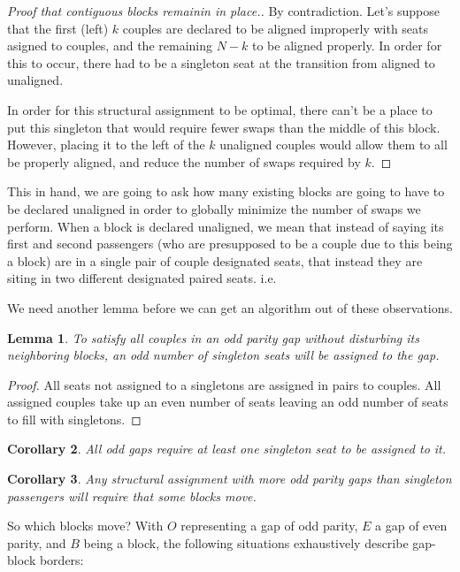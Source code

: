 \documentclass[a4paper]{article}
\newtheorem{lem}{Lemma}[section]
\newtheorem{cor}[lem]{Corollary}
\begin{document}
\begin{proof}[Proof that contiguous blocks remainin in place.]
By contradiction.  Let's suppose that the first (left) $k$ couples are declared to be aligned improperly with seats asigned to couples, and the remaining $N-k$ to be aligned properly.  In order for this to occur, there had to be a singleton seat at the transition from aligned to unaligned.  

In order for this structural assignment to be optimal, there can't be a place to put this singleton that would require fewer swaps than the middle of this block.  However, placing it to the left of the $k$ unaligned couples would allow them to all be properly aligned, and reduce the number of swaps required by $k$.
\end{proof}

This in hand, we are going to ask how many existing blocks are going to have to be declared unaligned in order to globally minimize the number of swaps we perform. When a block is declared unaligned, we mean that instead of saying its first and second passengers (who are presupposed to be a couple due to this being a block) are in a single pair of couple designated seats, that instead they are siting in two different designated paired seats.  i.e.


We need another lemma before we can get an algorithm out of these observations.

\begin{lem} \label{lem:oddGapsNeedSingletons}
To satisfy all couples in an odd parity gap without disturbing its neighboring blocks, an odd number of singleton seats will be assigned to the gap.
\end{lem}

\begin{proof}
All seats not assigned to a singletons are assigned in pairs to couples.  All assigned couples take up an even number of seats leaving an odd number of seats to fill with singletons.
\end{proof}

\begin{cor}
All odd gaps require at least one singleton seat to be assigned to it.
\end{cor}

\begin{cor}
Any structural assignment with more odd parity gaps than singleton passengers will require that some blocks move.
\end{cor}

So which blocks move?  With $O$ representing a gap of odd parity, $E$ a gap of even parity, and $B$ being a block, the following situations exhaustively describe gap-block borders:
\end{document}
